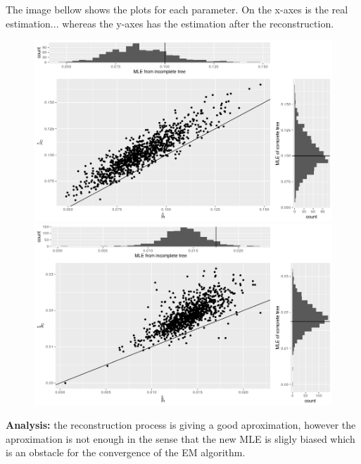 \documentclass[10pt,a4paper]{article}
\begin{document}
The image bellow shows the plots for each parameter. On the x-axes is the real estimation... whereas the y-axes has the estimation after the reconstruction. \\



\begin{figure}[!htb]
\endminipage\hfill
{}
  \includegraphics[width=\linewidth]{mu.png}
\endminipage\hfill
{}%
  \includegraphics[width=\linewidth]{beta.png}
\endminipage
\end{figure}

{\bf Analysis:} the reconstruction process is giving a good aproximation, however the aproximation is not enough in the sense that the new MLE is sligly biased which is an obstacle for the convergence of the EM algorithm. \\
\end{document}
